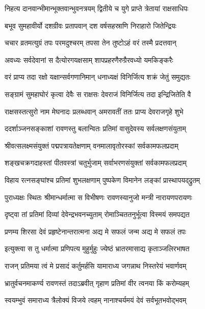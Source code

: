 \twolineshloka
{निहत्य दानवान्भीमान्भूक्तवान्भुवनत्रयम्}
{द्वितीये च युगे प्राप्ते त्रेतायां राक्षसाधिपः} %

\twolineshloka
{बभूव सुमहावीर्यो दशग्रीवः प्रतापवान्}
{दश वर्षसहस्राणि निराहारो जितेन्द्रियः} %

\twolineshloka
{चचार व्रतमत्युग्रं तपः परमदुश्चरम्}
{तपसा तेन तुष्टोऽहं वरं तस्मै प्रदत्तवान्} %

\twolineshloka
{अवध्यः सर्वदेवानां स दैत्योरगयक्षसाम्}
{शापप्रहरणैरुग्रैरवध्यो यमकिङ्करैः} %

\twolineshloka
{वरं प्राप्य तदा रक्षो यक्षान्सर्वगणानिमान्}
{धनाध्यक्षं विनिर्जित्य शक्रं जेतुं समुद्यतः} %

\twolineshloka
{सङ्ग्रामं सुमहाघोरं कृत्वा देवैः स राक्षसः}
{देवराजं विनिर्जित्य तदा इन्द्रिजितेति वै} %

\twolineshloka
{राक्षसस्तत्सुरो नाम मेघनादः प्रलब्धवान्}
{अमरावतीं ततः प्राप्य देवराजगृहे शुभे} %

\twolineshloka
{ददर्शाञ्जनसङ्काशां रावणस्तु बलान्वितः}
{प्रतिमां वासुदेवस्य सर्वलक्षणसंयुताम्} %

\twolineshloka
{श्रीवत्सलक्ष्मसंयुक्तं पद्मपत्रायतेक्षणाम्}
{वनमालावृतोरस्कां सर्वकामफलप्रदाम्} %

\twolineshloka
{शङ्खचक्रगदाहस्तां पीतवस्त्रां चतुर्भुजाम्}
{सर्वाभरणसंयुक्तां सर्वकामफलप्रदाम्} %

\twolineshloka
{विहाय रत्नसङ्घांश्च प्रतिमां शुभलक्षणाम्}
{पुष्पकेण विमानेन लङ्कां प्रास्थापयद्‌द्रुतम्} %

\twolineshloka
{पुराध्यक्षः स्थितः श्रीमान्धर्मात्मा स विभीषणः}
{रावणस्यानुजो मन्त्री नारायणपरायणः} %

\twolineshloka
{दृष्ट्वा तां प्रतिमां दिव्यां देवेन्द्रभवनच्युताम्}
{रोमाञ्चिततनुर्भूत्वा विस्मयं समपद्यत} %

\twolineshloka
{प्रणम्य शिरसा देवं प्रहृष्टेनान्तरात्मना}
{अद्य मे सफलं जन्म अद्य मे सफलं तपः} %

\twolineshloka
{इत्युक्त्वा स तु धर्मात्मा प्रणिपत्य मुहुर्मुहुः }
{ज्येष्ठं भ्रातरमासाद्य कृताञ्जलिरभाषत} %

\twolineshloka
{राजन् प्रतिमया त्वं मे प्रसादं कर्तुमर्हसि}
{यामाराध्य जगन्नाथ निस्तरेयं भवार्णवम्} %

\twolineshloka
{भ्रातुर्वचनमाकर्ण्य रावणस्तं तदाऽब्रवीत्}
{गृहाण प्रतिमां वीर त्वनया किं करोम्यहम्} %

\twolineshloka
{स्वयम्भुवं समाराध्य त्रैलोक्यं विजये त्वहम्}
{नानाश्चर्यमयं देवं सर्वभूतभवोद्भवम्} %

